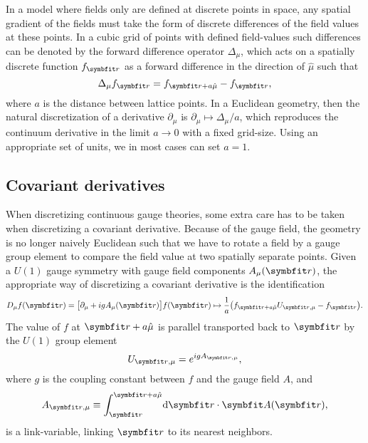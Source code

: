 In a model where fields only are defined at discrete points in space, any spatial gradient of the fields must take the form
of discrete differences of the field values at these points. In a cubic grid of points with defined field-values such
differences can be denoted by the forward difference operator $\Delta_\mu$, which acts on a spatially discrete function $f_\v{r}$
as a forward difference in the direction of $\hat{\mu}$ such that
\begin{equation}
    \label{eq:LM:Derivatives:forwardDifference}
    \Delta_\mu f_\v{r} = f_{\v{r}+a\hat{\mu}} - f_\v{r},
\end{equation}
where $a$ is the distance between lattice points.
In a Euclidean geometry, then the natural discretization of a derivative $\partial_\mu$ is $\partial_\mu \mapsto \Delta_\mu/a$, which
reproduces the continuum derivative in the limit $a\rightarrow0$ with a fixed grid-size.
Using an appropriate set of units, we in most cases can set $a=1$.

\subsection{Covariant derivatives}

When discretizing continuous gauge theories, some extra care has to be taken when discretizing a covariant
derivative. Because of the gauge field, the geometry is no longer naively Euclidean such that we have to
rotate a field by a gauge group element to compare the field value at two spatially separate points. Given
a $U(1)$ gauge symmetry with gauge field components $A_\mu(\v{r})$, the appropriate way of discretizing a covariant derivative
is the identification \cite{shimizu12}
\begin{equation}
    \label{eq:LM:Derivatives:covariantDiscreteMapping}
    D_\mu f(\v{r}) = \big[\partial_\mu + igA_\mu(\v{r})\big]f(\v{r}) \mapsto \frac{1}{a}\big(f_{\v{r}+a\hat{\mu}}U_{\v{r},\mu} - f_\v{r}\big).
\end{equation}
The value of $f$ at $\v{r}+a\hat{\mu}$ is parallel transported back to $\v{r}$ by the $U(1)$ group element \cite{Munster2000}
\begin{equation}
    \label{eq:LM:Derivatives:U1ParallelTransporter}
    U_{\v{r},\mu} = e^{igA_{\v{r},\mu}},
\end{equation}
where
$g$ is the coupling constant between $f$ and the gauge field $A$, and
\begin{equation}
    \label{eq:LM:Derivatives:linkVariable}
    A_{\v{r},\mu} \equiv \int_\v{r}^{\v{r}+a\hat{\mu}}\!\mathrm{d}\v{r}\cdot\v{A}(\v{r}),
\end{equation}
is a link-variable, linking $\v{r}$ to its nearest neighbors.

